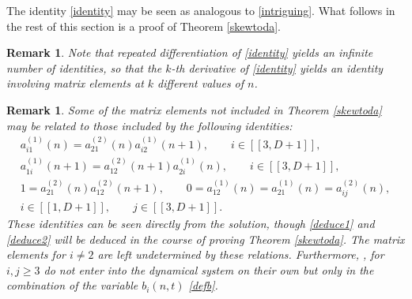 \documentclass[pdftex]{sigma}
\numberwithin{equation}{section}
\newtheorem{Remark}[Theorem]{Remark}
\begin{document}
The identity \eqref{identity} may be seen as analogous to \eqref{intriguing}. What follows in the rest of this section is a proof of Theorem \ref{skewtoda}.

\begin{Remark} Note that repeated differentiation of \eqref{identity} yields an infinite number of identities, so that the $k$-th derivative of \eqref{identity} yields an identity involving matrix elements at $k$ different values of $n$.
\end{Remark}

\begin{Remark}
Some of the matrix elements not included in Theorem \ref{skewtoda} may be related to those included by the following identities:
\begin{gather}
a_{i1}^{(1)}(n) = a_{21}^{(2)}(n) a_{i2}^{(1)}(n+1),\qquad i \in [\![ 3, D+1]\!], \label{deduce1} \\
a_{1i}^{(1)}(n+1) = a_{12}^{(2)}(n+1) a_{2i}^{(1)}(n),\qquad i \in [\![ 3, D+1]\!], \label{deduce2} \\
1 = a_{21}^{(2)}(n) a_{12}^{(2)}(n+1) ,\qquad
0 = a_{12}^{(1)}(n) = a_{21}^{(1)}(n) = a_{ij}^{(2)}(n),\nonumber\\ i \in [\![ 1, D+1]\!] ,\qquad j\in [\![ 3, D+1]\!] .\nonumber
\end{gather}
These identities can be seen directly from the solution, though \eqref{deduce1} and \eqref{deduce2} will be deduced in the course of proving Theorem \ref{skewtoda}. The matrix elements  for $i\neq 2$ are left undetermined by these relations. Furthermore, , for $i,j \geq 3$ do not enter into the dynamical system on their own but only in the combination of the variable $b_i(n,t)$ \eqref{defb}.
\end{Remark}
\end{document}
